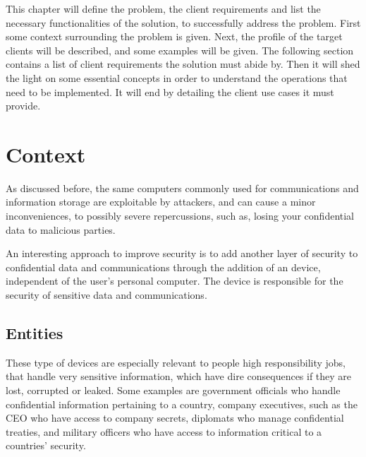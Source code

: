 \cleardoublepage
\label{chap:problem}

This chapter will define the problem, the client requirements and list the necessary functionalities of the solution, to successfully address the problem.
First some context surrounding the problem is given. 
Next, the profile of the target clients will be described, and some examples will be given.
The following section contains a list of client requirements the solution must abide by.
Then it will shed the light on some essential concepts in order to understand the operations that need to be implemented.
It will end by detailing the client use cases it must provide.

\section{Context}\label{chap:problem:context}
As discussed before, the same computers commonly used for communications and information storage are exploitable by attackers, and can cause a minor inconveniences, to possibly severe repercussions, such as, losing your confidential data to malicious parties.

An interesting approach to improve security is to add another layer of security to confidential data and communications through the addition of an device, independent of the user's personal computer. The device is responsible for the security of sensitive data and communications.


\subsection{Entities}\label{chap:problem:entities}

These type of devices are especially relevant to people high responsibility jobs, that handle very sensitive information, which have dire consequences if they are lost, corrupted or leaked.
Some examples are government officials who handle confidential information pertaining to a country, company executives, such as the CEO who have access to company secrets, diplomats who manage confidential treaties, and military officers who have access to information critical to a countries' security.


